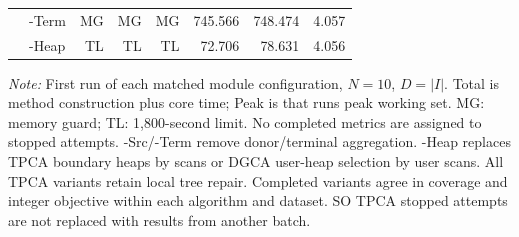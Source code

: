 \begin{table}[t]
\begin{tabular*}{\textwidth}{@{\extracolsep{\fill}}llrrrrrr@{}}
 & -Term & MG & MG & MG & 745.566 & 748.474 & 4.057 \\
 & -Heap & TL & TL & TL & 72.706 & 78.631 & 4.056 \\
\bottomrule
\end{tabular*}
\par\smallskip
\begin{minipage}{.98\textwidth}\footnotesize
\textit{Note:} First run of each matched module configuration, $N=10$, $D=|I|$. Total is method construction plus core time; Peak is that run\textquotesingle s peak working set. MG: memory guard; TL: 1,800-second limit. No completed metrics are assigned to stopped attempts. -Src/-Term remove donor/terminal aggregation. -Heap replaces TPCA boundary heaps by scans or DGCA user-heap selection by user scans. All TPCA variants retain local tree repair. Completed variants agree in coverage and integer objective within each algorithm and dataset. SO TPCA stopped attempts are not replaced with results from another batch.
\end{minipage}
\end{table}
